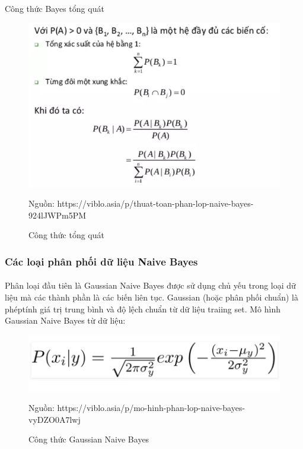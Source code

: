 \documentclass{article}
\begin{document}
\paragraph{}Công thức Bayes tổng quát
\begin{figure}[!h]
	\begin{center}
		\includegraphics[width=\linewidth]{images/congthuctongquat.png}
		\caption{\fontsize{14}{20}\selectfont Công thức tổng quát}
		Nguồn: https://viblo.asia/p/thuat-toan-phan-lop-naive-bayes-924lJWPm5PM
	\end{center}
\end{figure}
\pagebreak{}
\subsubsection{Các loại phân phối dữ liệu Naive Bayes}
\paragraph{}Phân loại đầu tiên là Gaussian Naive Bayes được sử dụng chủ yếu trong loại dữ liệu mà các thành phần là các biến liên tục. Gaussian (hoặc phân phối chuẩn) là phéptính giá trị trung bình và độ lệch chuẩn từ dữ liệu traiing set. Mô hình Gaussian Naive Bayes từ dữ liệu:
\begin{figure}[!h]
	\begin{center}
		\includegraphics[width=\linewidth]{images/Gaussian.png}
		\caption{\fontsize{14}{20}\selectfont Công thức Gaussian Naive Bayes}
		Nguồn: https://viblo.asia/p/mo-hinh-phan-lop-naive-bayes-vyDZO0A7lwj
	\end{center}
\end{figure}
\end{document}
